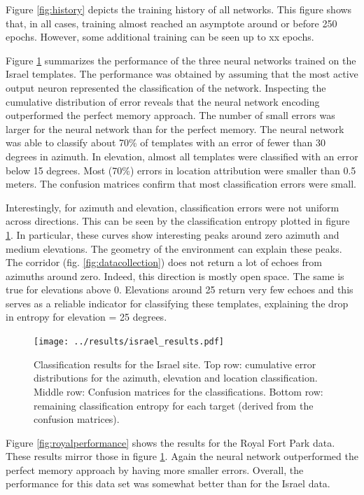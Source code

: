 \documentclass[preprint,5p]{elsarticle}
\begin{document}
Figure \ref{fig:history} depicts the training history of all networks. This figure shows that, in all cases, training almost reached an asymptote around or before 250 epochs. However, some additional training can be seen up to xx epochs.

Figure \ref{fig:israelperformance} summarizes the performance of the three neural networks trained on the Israel templates. The performance was obtained by assuming that the most active output neuron represented the classification of the network. Inspecting the cumulative distribution of error reveals that the neural network encoding outperformed the perfect memory approach. The number of small errors was larger for the neural network than for the perfect memory. The neural network was able to classify about 70\% of templates with an error of fewer than 30 degrees in azimuth. In elevation, almost all templates were classified with an error below 15 degrees. Most (70\%) errors in location attribution were smaller than 0.5 meters. The confusion matrices confirm that most classification errors were small.

Interestingly, for azimuth and elevation, classification errors were not uniform across directions. This can be seen by the classification entropy plotted in figure \ref{fig:israelperformance}. In particular, these curves show interesting peaks around zero azimuth and medium elevations. The geometry of the environment can explain these peaks. The corridor (fig. \ref{fig:datacollection}) does not return a lot of echoes from azimuths around zero. Indeed, this direction is mostly open space. The same is true for elevations above 0. Elevations around 25 return very few echoes and this serves as a reliable indicator for classifying these templates, explaining the drop in entropy for elevation = 25 degrees.

\begin{figure}
	\centering
	\texttt{[image: ../results/israel\_results.pdf]}
	\caption{Classification results for the Israel site. Top row: cumulative error distributions for the azimuth, elevation and location classification. Middle row: Confusion matrices for the classifications. Bottom row: remaining classification entropy for each target (derived from the confusion matrices).}
	\label{fig:israelperformance}
\end{figure}

Figure \ref{fig:royalperformance} shows the results for the Royal Fort Park data. These results mirror those in figure \ref{fig:israelperformance}. Again the neural network outperformed the perfect memory approach by having more smaller errors. Overall, the performance for this data set was somewhat better than for the Israel data.
\end{document}
